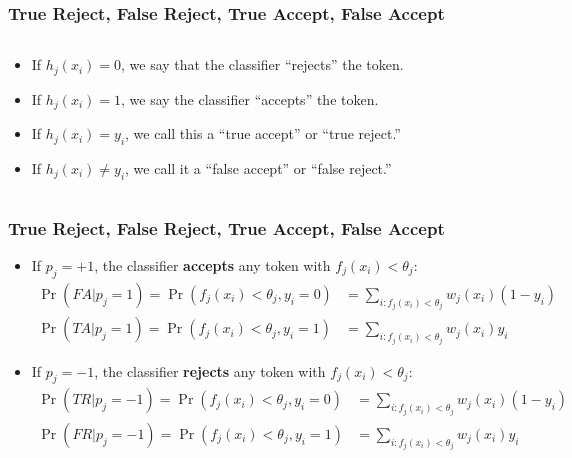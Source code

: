 \documentclass{beamer}
\begin{document}
\begin{frame}
  \frametitle{True Reject, False Reject, True Accept, False Accept}
  \begin{columns}
    \begin{column}{0.5\textwidth}
      \begin{itemize}
        \item 
          If $h_j(x_i)=0$, we say that the classifier ``rejects'' the token.
        \item
          If $h_j(x_i)=1$, we say the classifier ``accepts'' the token.
        \item
          If $h_j(x_i)=y_i$, we call this a ``true accept'' or ``true reject.''
        \item
          If $h_j(x_i)\ne y_i$, we call it a ``false accept'' or ``false reject.''
      \end{itemize}
    \end{column}
  \end{columns}
\end{frame}

\begin{frame}
  \frametitle{True Reject, False Reject, True Accept, False Accept}

  \begin{itemize}
  \item If $p_j=+1$, the classifier {\bf accepts} any token with $f_j(x_i)<\theta_j$:
    \begin{align*}
      \Pr(FA|p_j=1) = \Pr(f_j(x_i)<\theta_j,y_i=0) &= \sum_{i:f_j(x_i)<\theta_j} w_j(x_i)(1-y_i)\\
      \Pr(TA|p_j=1) = \Pr(f_j(x_i)<\theta_j,y_i=1) &= \sum_{i:f_j(x_i)<\theta_j} w_j(x_i)y_i
    \end{align*}
  \item If $p_j=-1$, the classifier {\bf rejects} any token with $f_j(x_i)<\theta_j$:
    \begin{align*}
      \Pr(TR|p_j=-1) = \Pr(f_j(x_i)<\theta_j,y_i=0) &= \sum_{i:f_j(x_i)<\theta_j} w_j(x_i)(1-y_i)\\
      \Pr(FR|p_j=-1) = \Pr(f_j(x_i)<\theta_j,y_i=1) &= \sum_{i:f_j(x_i)<\theta_j} w_j(x_i)y_i
    \end{align*}
  \end{itemize}
\end{frame}
\end{document}
